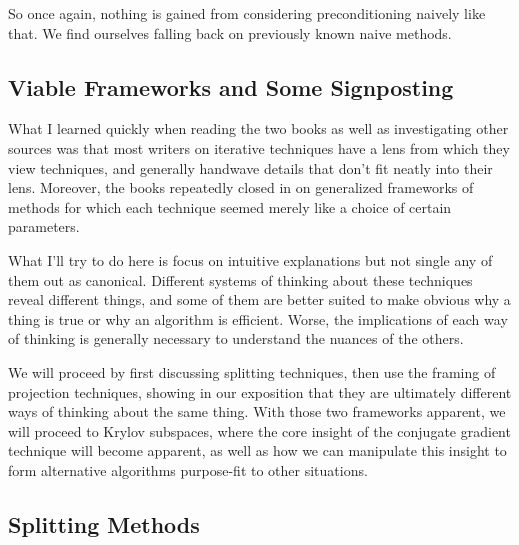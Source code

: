 \documentclass[11pt]{article}
\begin{document}
So once again, nothing is gained from considering preconditioning naively like that. We find ourselves falling back on previously known naive methods.

\subsection{Viable Frameworks and Some Signposting}

What I learned quickly when reading the two books as well as investigating other sources was that most writers on iterative techniques have a lens from which they view techniques, and generally handwave details that don't fit neatly into their lens. Moreover, the books repeatedly closed in on generalized frameworks of methods for which each technique seemed merely like a choice of certain parameters.

What I'll try to do here is focus on intuitive explanations but not single any of them out as canonical. Different systems of thinking about these techniques reveal different things, and some of them are better suited to make obvious why a thing is true or why an algorithm is efficient. Worse, the implications of each way of thinking is generally necessary to understand the nuances of the others.

We will proceed by first discussing splitting techniques, then use the framing of projection techniques, showing in our exposition that they are ultimately different ways of thinking about the same thing. With those two frameworks apparent, we will proceed to Krylov subspaces, where the core insight of the conjugate gradient technique will become apparent, as well as how we can manipulate this insight to form alternative algorithms purpose-fit to other situations.

\subsection{Splitting Methods}
\end{document}
